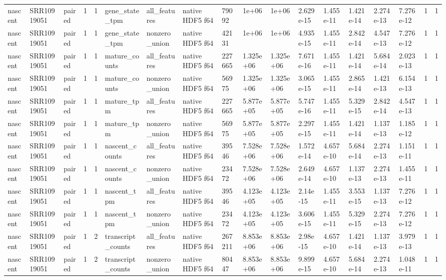 \begin{tabular}{llllllllllllllllll}
nascent & SRR10919051 & paired & 1 & 1 & gene\_state\_tpm & all\_features & native HDF5 f64 & 79092 & 1e+06 & 1e+06 & 2.629e-15 & 1.455e-11 & 1.421e-14 & 2.274e-13 & 7.276e-12 & 1 & 1 \\
nascent & SRR10919051 & paired & 1 & 1 & gene\_state\_tpm & nonzero\_union & native HDF5 f64 & 42131 & 1e+06 & 1e+06 & 4.935e-15 & 1.455e-11 & 2.842e-14 & 4.547e-13 & 7.276e-12 & 1 & 1 \\
nascent & SRR10919051 & paired & 1 & 1 & mature\_counts & all\_features & native HDF5 f64 & 227665 & 1.325e+06 & 1.325e+06 & 7.671e-16 & 1.455e-11 & 1.421e-14 & 5.684e-14 & 2.023e-13 & 1 & 1 \\
nascent & SRR10919051 & paired & 1 & 1 & mature\_counts & nonzero\_union & native HDF5 f64 & 56975 & 1.325e+06 & 1.325e+06 & 3.065e-15 & 1.455e-11 & 2.865e-14 & 1.421e-13 & 6.154e-13 & 1 & 1 \\
nascent & SRR10919051 & paired & 1 & 1 & mature\_tpm & all\_features & native HDF5 f64 & 227665 & 5.877e+05 & 5.877e+05 & 5.747e-16 & 1.455e-11 & 5.329e-15 & 2.842e-14 & 4.547e-13 & 1 & 1 \\
nascent & SRR10919051 & paired & 1 & 1 & mature\_tpm & nonzero\_union & native HDF5 f64 & 56975 & 5.877e+05 & 5.877e+05 & 2.297e-15 & 1.455e-11 & 1.421e-14 & 1.137e-13 & 1.185e-12 & 1 & 1 \\
nascent & SRR10919051 & paired & 1 & 1 & nascent\_counts & all\_features & native HDF5 f64 & 39546 & 7.528e+06 & 7.528e+06 & 1.572e-14 & 4.657e-10 & 5.684e-14 & 2.274e-13 & 1.151e-11 & 1 & 1 \\
nascent & SRR10919051 & paired & 1 & 1 & nascent\_counts & nonzero\_union & native HDF5 f64 & 23472 & 7.528e+06 & 7.528e+06 & 2.649e-14 & 4.657e-10 & 1.137e-13 & 2.274e-13 & 1.455e-11 & 1 & 1 \\
nascent & SRR10919051 & paired & 1 & 1 & nascent\_tpm & all\_features & native HDF5 f64 & 39546 & 4.123e+05 & 4.123e+05 & 2.14e-15 & 1.455e-11 & 3.553e-15 & 1.137e-13 & 7.276e-12 & 1 & 1 \\
nascent & SRR10919051 & paired & 1 & 1 & nascent\_tpm & nonzero\_union & native HDF5 f64 & 23472 & 4.123e+05 & 4.123e+05 & 3.606e-15 & 1.455e-11 & 5.329e-15 & 2.274e-13 & 7.276e-12 & 1 & 1 \\
nascent & SRR10919051 & paired & 1 & 2 & transcript\_counts & all\_features & native HDF5 f64 & 267211 & 8.853e+06 & 8.853e+06 & 2.98e-15 & 4.657e-10 & 1.421e-14 & 1.137e-13 & 3.979e-13 & 1 & 1 \\
nascent & SRR10919051 & paired & 1 & 2 & transcript\_counts & nonzero\_union & native HDF5 f64 & 80447 & 8.853e+06 & 8.853e+06 & 9.899e-15 & 4.657e-10 & 5.684e-14 & 2.274e-13 & 1.048e-11 & 1 & 1 \\

\end{tabular}
